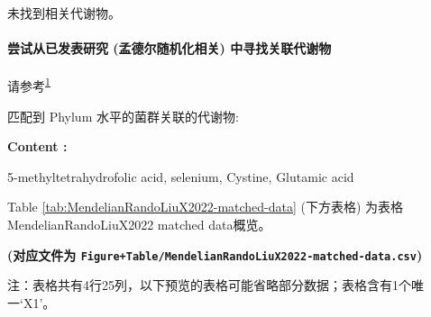 \documentclass[
]{article}
\begin{document}
未找到相关代谢物。

\hypertarget{mr-match}{%
\paragraph{尝试从已发表研究 (孟德尔随机化相关) 中寻找关联代谢物}\label{mr-match}}

请参考\textsuperscript{\protect\hyperlink{ref-MendelianRandoLiuX2022}{1}}

匹配到 Phylum 水平的菌群关联的代谢物:

\begin{center}\begin{tcolorbox}[colback=gray!10, colframe=gray!50, width=0.9\linewidth, arc=1mm, boxrule=0.5pt]
\textbf{
Content
:}

\vspace{0.5em}

    5-methyltetrahydrofolic acid, selenium, Cystine,
Glutamic acid

\vspace{2em}
\end{tcolorbox}
\end{center}

Table \ref{tab:MendelianRandoLiuX2022-matched-data} (下方表格) 为表格MendelianRandoLiuX2022 matched data概览。

\textbf{(对应文件为 \texttt{Figure+Table/MendelianRandoLiuX2022-matched-data.csv})}

\begin{center}\begin{tcolorbox}[colback=gray!10, colframe=gray!50, width=0.9\linewidth, arc=1mm, boxrule=0.5pt]注：表格共有4行25列，以下预览的表格可能省略部分数据；表格含有1个唯一`X1'。
\end{tcolorbox}
\end{center}
\end{document}
